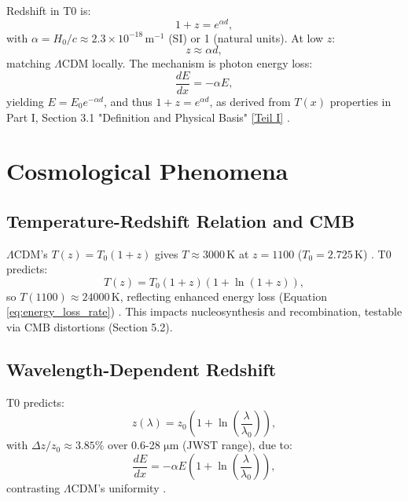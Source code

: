\documentclass[twocolumn,aps,prl]{revtex4-2}
\newcommand{\Tfield}{T(x)}
\newcommand{\LCDM}{\Lambda\text{CDM}}
\begin{document}
	Redshift in T0 is:
	\begin{equation}
		1 + z = e^{\alpha d},
		\label{eq:redshift_distance}
	\end{equation}
	with \(\alpha = H_0 / c \approx 2.3 \times 10^{-18} \, \text{m}^{-1}\) (SI) or 1 (natural units). At low \(z\):
	\begin{equation}
		z \approx \alpha d,
		\label{eq:hubble_approx}
	\end{equation}
	matching \(\LCDM\) locally. The mechanism is photon energy loss:
	\begin{equation}
		\frac{dE}{dx} = -\alpha E,
		\label{eq:energy_loss_rate}
	\end{equation}
	yielding \(E = E_0 e^{-\alpha d}\), and thus \(1 + z = e^{\alpha d}\), as derived from \(\Tfield\) properties in Part I, Section 3.1 "Definition and Physical Basis" \href{https://github.com/jpascher/T0-Time-Mass-Duality/tree/main/2/pdf/English/QMRelTimeMassPart1En.pdf}{[Teil I]} \cite{pascher_messdifferenzen_2025}.
	
	\section{Cosmological Phenomena}
	\label{sec:cosmological_phenomena}
	
	\subsection{Temperature-Redshift Relation and CMB}
	\label{subsec:cmb_temp}
	
	\(\LCDM\)'s \(T(z) = T_0 (1 + z)\) gives \(T \approx 3000 \, \text{K}\) at \(z = 1100\) (\(T_0 = 2.725 \, \text{K}\)) \cite{Fixsen2009}. T0 predicts:
	\begin{equation}
		T(z) = T_0 (1 + z) (1 + \ln(1 + z)),
		\label{eq:temperature_redshift_simplified}
	\end{equation}
	so \(T(1100) \approx 24000 \, \text{K}\), reflecting enhanced energy loss (Equation \ref{eq:energy_loss_rate}) \cite{pascher_temp_2025}. This impacts nucleosynthesis and recombination, testable via CMB distortions (Section 5.2).
	
	\subsection{Wavelength-Dependent Redshift}
	\label{subsec:wavelength_redshift}
	
	T0 predicts:
	\begin{equation}
		z(\lambda) = z_0 \left(1 + \ln\left(\frac{\lambda}{\lambda_0}\right)\right),
		\label{eq:wavelength_redshift}
	\end{equation}
	with \(\Delta z / z_0 \approx 3.85\%\) over 0.6-28 \(\si{\micro\meter}\) (JWST range), due to:
	\begin{equation}
		\frac{dE}{dx} = -\alpha E \left(1 + \ln\left(\frac{\lambda}{\lambda_0}\right)\right),
		\label{eq:wavelength_energy_loss}
	\end{equation}
	contrasting \(\LCDM\)'s uniformity \cite{pascher_params_2025}.
	
\end{document}
